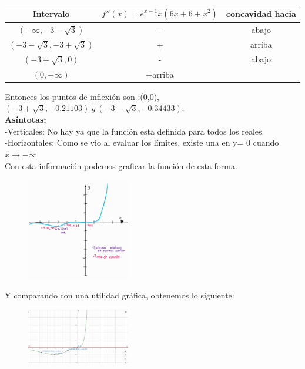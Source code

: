 \documentclass[12pt]{article}
\begin{document}
 \begin{table}[H]
    \centering
    \begin{tabular}{c|c|c}
      \hline
      Intervalo & $f''(x) = e^{x-1} x ( 6x+ 6  +   x^{2} )$ & concavidad hacia  \\
      \hline
      $(-\infty,-3-\sqrt{3})$ & - & abajo  \\
      $(-3-\sqrt{3}, -3+\sqrt{3})$ & + & arriba  \\
      $(-3+\sqrt{3}, 0)$ & - & abajo  \\
      $(0,+\infty)$ & +arriba \\
      \hline
    \end{tabular}
 \end{table}
  Entonces los  puntos de inflexión son :(0,0), $(-3+ \sqrt{3},-0.21103 ) ~y~ (-3 - \sqrt{3},  -0.34433 ).$
 \\\textbf{Asíntotas:}\\
 -Verticales: No hay ya que la función esta definida para todos los reales. \\
 -Horizontales: Como se vio al evaluar los límites, existe una en y= 0 cuando $x \rightarrow - \infty$ \\


 Con esta información podemos graficar la función de esta forma.\\
\begin{figure}[H]
\centering
\includegraphics[width=0.4\textwidth]{../img/img_Lista3/54_1.png}
\end{figure}

Y comparando con una utilidad gráfica, obtenemos lo siguiente:
\begin{figure}[H]
\centering
 \includegraphics[width=0.4\textwidth]{../img/img_Lista3/54_2.png}
\end{figure}
\end{document}
